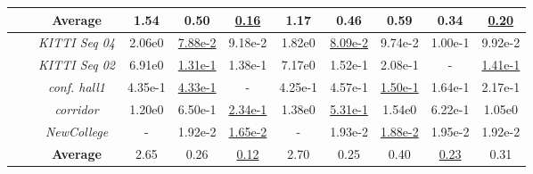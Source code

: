 \begin{table}[t]
\begin{tabular}{c|c||c|c|c||c|c|c|c|c}
		\cline{2-10} 
		\vspace{-1pt}
		& \textbf{Average}  		& 1.54 	& 0.50 	& \underline{0.16}  & 1.17 & 0.46 & 0.59 & 0.34 & \underline{0.20} \\ 
		\midrule
		\  \parbox[t]{1mm}{}\ 
				
		& \textit{KITTI Seq 04} 	& 2.06e0 	& \underline{7.88e-2} 	& 9.18e-2  & \textcolor{f0}{1.82e0} & \underline{\textcolor{f0}{8.09e-2}}&\textcolor{f0}{9.74e-2} & \textcolor{f0}{1.00e-1} &  \textcolor{f0}{9.92e-2} \\ 
		
		& \textit{KITTI Seq 02}		& 6.91e0		& \underline{1.31e-1}		& 1.38e-1	 & \textcolor{f0}{7.17e0} & \textcolor{f0}{1.52e-1}& \textcolor{f2}{2.08e-1} & - &  \underline{\textcolor{f3}{1.41e-1}}\\	
		
		& \textit{conf. hall1} 		& 4.35e-1  & \underline{4.33e-1}	& -	 & \textcolor{f0}{4.25e-1}& \textcolor{f0}{4.57e-1}& \underline{\textcolor{f4}{1.50e-1}}& \textcolor{f0}{1.64e-1}& \textcolor{f1}{2.17e-1}\\%
		
		& \textit{corridor}			& 1.20e0	&	6.50e-1		&	\underline{2.34e-1}	 & \textcolor{f0}{1.38e0}& \underline{\textcolor{f0}{5.31e-1}}& \textcolor{f4}{1.54e0}& \textcolor{f0}{6.22e-1}& \textcolor{f1}{1.05e0}\\
		
		& \textit{NewCollege}  		& -        & 1.92e-2   & \underline{1.65e-2}  & - & \textcolor{f0}{1.93e-2} & \underline{\textcolor{f1}{1.88e-2}}& \textcolor{f0}{1.95e-2}&  \textcolor{f0}{1.92e-2}\\ 	
		\vspace{-1pt}
		& \textbf{Average}  		& 2.65 	& 0.26 	& \underline{0.12}  & 2.70 & 0.25 & 0.40 & \underline{0.23} & 0.31 \\ 
		\midrule[0.1pt]
 	\bottomrule	[1pt]
	\end{tabular} 
	\label{tab:accuracy_summary}
\end{table}



